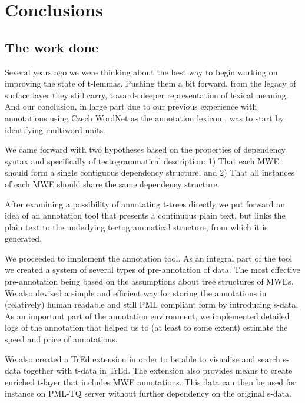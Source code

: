 
\chapter{Conclusions}
\label{sec:conclusion}
\todo

\section{The work done}

Several years ago we were thinking about the best way to begin working on improving the state of t-lemmas. Pushing them a bit forward, from the legacy of surface layer they still carry, towards deeper representation of lexical meaning. And our conclusion, in large part due to our previous experience with annotations using Czech WordNet as the annotation lexicon \citep{holub:2003,bejcek:2006}, was to start by identifying multiword units.

We came forward with two hypotheses based on the properties of dependency syntax and specifically of tectogrammatical description: 1) That each MWE should form a single contiguous dependency structure, and 2) That all instances of each MWE should share the same dependency structure.

After examining a possibility of annotating t-trees directly we put forward an idea of an annotation tool that presents a continuous plain text, but links the plain text to the underlying tectogrammatical structure, from which it is generated. 

We proceeded to implement the annotation tool. As an integral part of the tool we created a system of several types of pre-annotation of data. The most effective pre-annotation being based on the assumptions about tree structures of MWEs. We also devised a simple and efficient way for storing the annotations in (relatively) human readable and still PML compliant form by introducing s-data. As an important part of the annotation environment, we implemented detailed logs of the annotation that helped us to (at least to some extent) estimate the speed and price of annotations.

We also created a TrEd extension in order to be able to visualise and search s-data together with t-data in TrEd. The extension also provides means to create enriched t-layer that includes MWE annotations. This data can then be used for instance on PML-TQ server without further dependency on the original s-data.

